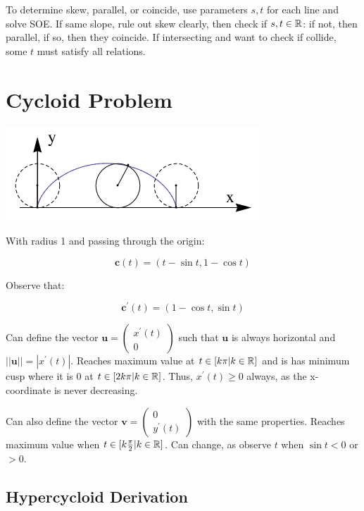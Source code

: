 \noindent
To determine skew, parallel, or coincide, use parameters $s,t$ for each line and solve SOE.
If same slope, rule out skew clearly, then check if $s,t\in\mathbb{R}$: if not, then parallel, if so, then they coincide. If intersecting and want to check if collide, some $t$
must satisfy all relations.

\section{Cycloid Problem}

\begin{center}
    \includegraphics*[scale=0.9]{figures/cycloid.png}
\end{center}

With radius 1 and passing through the origin:

\[\textbf{c}(t)=(t-\sin t, 1 - \cos t)\]

Observe that:

\[\textbf{c}^\prime(t)=(1-\cos t, \sin t)\]

Can define the vector $\textbf{u}=\left(\begin{array}{c}x^{\prime}(t) \\0\end{array}\right)$
such that $\textbf{u}$ is always horizontal and $||\textbf{u}||=|x^\prime(t)|$. Reaches maximum
value at $t\in[k\pi|k\in\mathbb{R}]$ and is has minimum cusp where it is 0 at $t\in [2k\pi|k\in\mathbb{R}]$.
Thus, $x^\prime(t)\geq 0$ always, as the x-coordinate is never decreasing. \newline

\noindent
Can also define the vector $\textbf{v}=\left(\begin{array}{c}0 \\y^{\prime}(t)\end{array}\right)$
with the same properties. Reaches maximum value when $t\in[k\frac{\pi}{2}|k\in\mathbb{R}]$.
Can change, as observe $t$ when $\sin t < 0$ or $ >0 $.

\subsection{Hypercycloid Derivation}

